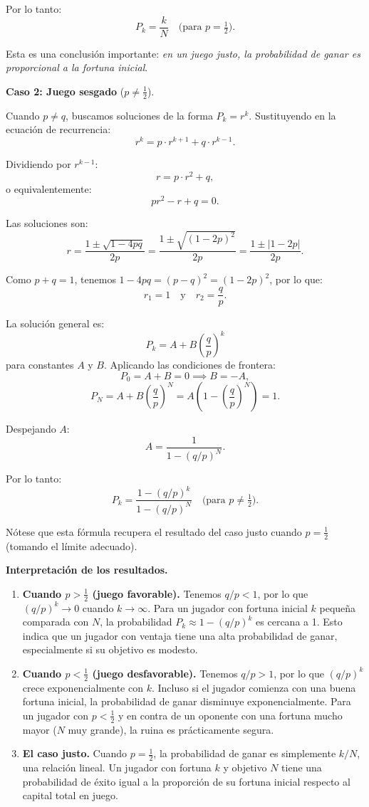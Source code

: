 \documentclass[12pt]{book}
\begin{document}
Por lo tanto:
\[
\boxed{P_k = \frac{k}{N} \quad \text{(para } p = \tfrac{1}{2}\text{)}.}
\]

Esta es una conclusión importante: \textit{en un juego justo, la probabilidad de ganar es proporcional a la fortuna inicial}.

\textbf{Caso 2: Juego sesgado} ($p \neq \frac{1}{2}$).

Cuando $p \neq q$, buscamos soluciones de la forma $P_k = r^k$. Sustituyendo en la ecuación de recurrencia:
\[
r^k = p \cdot r^{k+1} + q \cdot r^{k-1}.
\]

Dividiendo por $r^{k-1}$:
\[
r = p \cdot r^2 + q,
\]
o equivalentemente:
\[
p r^2 - r + q = 0.
\]

Las soluciones son:
\[
r = \frac{1 \pm \sqrt{1 - 4pq}}{2p} = \frac{1 \pm \sqrt{(1 - 2p)^2}}{2p} = \frac{1 \pm |1 - 2p|}{2p}.
\]

Como $p + q = 1$, tenemos $1 - 4pq = (p - q)^2 = (1 - 2p)^2$, por lo que:
\[
r_1 = 1 \quad \text{y} \quad r_2 = \frac{q}{p}.
\]

La solución general es:
\[
P_k = A + B \left(\frac{q}{p}\right)^k
\]
para constantes $A$ y $B$. Aplicando las condiciones de frontera:
\[
P_0 = A + B = 0 \implies B = -A,
\]
\[
P_N = A + B \left(\frac{q}{p}\right)^N = A \left(1 - \left(\frac{q}{p}\right)^N\right) = 1.
\]

Despejando $A$:
\[
A = \frac{1}{1 - (q/p)^N}.
\]

Por lo tanto:
\[
\boxed{P_k = \frac{1 - (q/p)^k}{1 - (q/p)^N} \quad \text{(para } p \neq \tfrac{1}{2}\text{)}.}
\]

Nótese que esta fórmula recupera el resultado del caso justo cuando $p = \frac{1}{2}$ (tomando el límite adecuado).

\textbf{Interpretación de los resultados.}

\begin{enumerate}
    \item \textbf{Cuando $p > \frac{1}{2}$ (juego favorable).} Tenemos $q/p < 1$, por lo que $(q/p)^k \to 0$ cuando $k \to \infty$. Para un jugador con fortuna inicial $k$ pequeña comparada con $N$, la probabilidad $P_k \approx 1 - (q/p)^k$ es cercana a 1. Esto indica que un jugador con ventaja tiene una alta probabilidad de ganar, especialmente si su objetivo es modesto.
    
    \item \textbf{Cuando $p < \frac{1}{2}$ (juego desfavorable).} Tenemos $q/p > 1$, por lo que $(q/p)^k$ crece exponencialmente con $k$. Incluso si el jugador comienza con una buena fortuna inicial, la probabilidad de ganar disminuye exponencialmente. Para un jugador con $p < \frac{1}{2}$ y en contra de un oponente con una fortuna mucho mayor ($N$ muy grande), la ruina es prácticamente segura.
    
    \item \textbf{El caso justo.} Cuando $p = \frac{1}{2}$, la probabilidad de ganar es simplemente $k/N$, una relación lineal. Un jugador con fortuna $k$ y objetivo $N$ tiene una probabilidad de éxito igual a la proporción de su fortuna inicial respecto al capital total en juego.
\end{enumerate}
\end{document}
